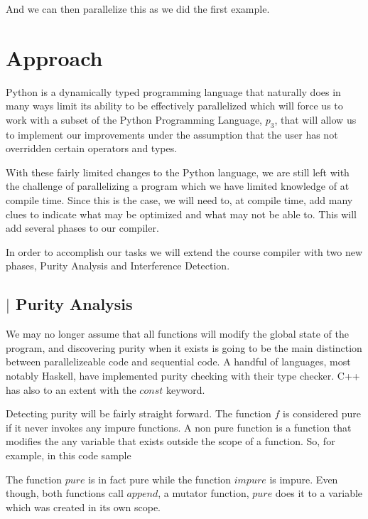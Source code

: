 \documentclass{article}
\begin{document}
\begin{multicols}{2}

And we can then parallelize this as we did the first example.

\section{Approach}

Python is a dynamically typed programming language that naturally does in many
ways limit its ability to be effectively parallelized which will force us to
work with a subset of the Python Programming Language, $p_3$, that will allow us to
implement our improvements under the assumption that the user has not
overridden certain operators and types.

With these fairly limited changes to the Python language, we are still left with
the challenge of parallelizing a program which we have limited knowledge of at compile time.
Since this is the case, we will need to, at compile time, add many clues to indicate what
may be optimized and what may not be able to. This will add several phases to our compiler.

In order to accomplish our tasks we will extend the course compiler with two new phases, Purity Analysis and Interference Detection. 

\subsection*{$\vert$ Purity Analysis}

We may no longer assume that all functions will modify the global state of the program,
and discovering purity when it exists is going to be the main distinction between parallelizeable
code and sequential code. A handful of languages, most notably Haskell, have implemented
purity checking with their type checker. C++ has also to an extent with the $const$ keyword.

Detecting purity will be fairly straight forward. The function $f$ is considered pure if
it never invokes any impure functions. A non pure function is a function that modifies
the any variable that exists outside the scope of a function. So, for example, in this code
sample



The function $pure$ is in fact pure while the function $impure$ is impure. Even though,
both functions call $append$, a mutator function, $pure$ does it to a variable which
was created in its own scope.


\end{multicols}
\end{document}
